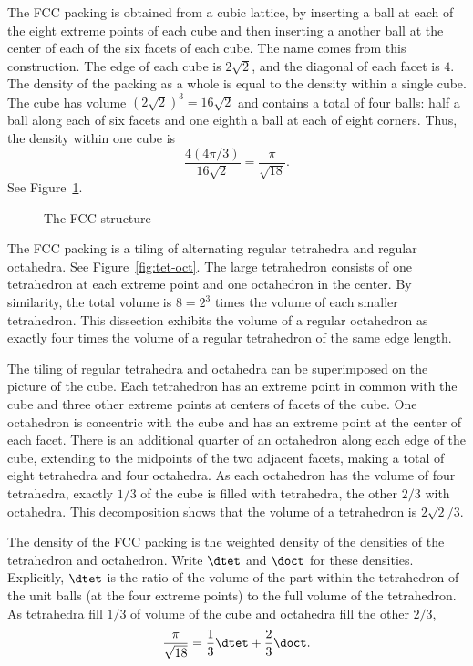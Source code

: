 The FCC packing is  obtained from a cubic
lattice, by inserting a ball at each of the eight extreme points of
each cube and then inserting a another ball at the center of each
of the six facets of each cube.  The name  comes from this
construction.  The edge of each cube is $2\sqrt2$, and the diagonal of
each facet is $4$.  
  The density of the packing as a whole 
is equal to the density within a single cube.  The cube has volume
$(2\sqrt2)^3 = 16\sqrt2$  and contains a total of four balls: half a
ball along each of six facets and one eighth a ball at each of eight
corners.  Thus, the density within one cube is
   \[ 
   \frac{   4 (4\pi/3)}{16\sqrt2} = \frac{\pi}{\sqrt{18}}.
   \] 
See Figure~\ref{fig:fcc-cube}.

\begin{figure}[htb]
  \centering
  \caption{The FCC structure}
  \label{fig:fcc-cube}
\end{figure}


The FCC packing is a tiling of alternating regular tetrahedra and
regular octahedra.  See Figure~\ref{fig:tet-oct}.  The large tetrahedron consists of  one
tetrahedron at each extreme point and one octahedron in the center. By
similarity, the total volume is $8 = 2^3$ times the volume of each
smaller tetrahedron. This dissection exhibits the volume of a regular
octahedron as exactly four times the volume of a regular tetrahedron
of the same edge length.

The tiling of regular tetrahedra and octahedra can be
superimposed on the picture of the cube.  Each tetrahedron has an extreme point
in common with the cube and three other extreme points at centers of facets
of the cube.   One octahedron is concentric with the cube and has an extreme
point at the center of each facet.  There is an
additional quarter of an octahedron along each edge of the cube, extending to the
midpoints of the two adjacent facets, making a total of eight
tetrahedra and four octahedra.  As each octahedron has the volume of
four tetrahedra, exactly $1/3$ of the cube is filled with tetrahedra,
the other $2/3$ with octahedra.  This decomposition shows that the
volume of a tetrahedron is $2\sqrt2/3$.

The density of the FCC packing is the weighted density
of the densities of the tetrahedron and octahedron.  Write $\dtet$ and
$\doct$ for these densities.  Explicitly, $\dtet$ is the ratio of the
volume of the part within the tetrahedron of the unit balls (at the
four extreme points) to the full volume of the tetrahedron.  As tetrahedra fill
$1/3$ of volume of the cube and octahedra fill
the other $2/3$,
\[ 
  \frac{\pi}{\sqrt{18}} = \frac{1}{3}\dtet + \frac{2}{3}\doct.
\] 

